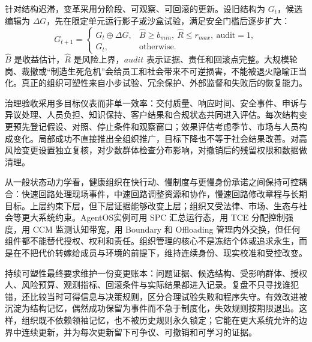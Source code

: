 针对结构迟滞，变革采用分阶段、可观察、可回滚的更新。设旧结构为 $G_t$，候选编辑为 $\Delta G$，先在限定单元运行影子或沙盒试验，满足安全门槛后逐步扩大：
\begin{equation}
 G_{t+1}=\begin{cases}G_t\oplus\Delta G,& \widehat B\geq b_{min},\ \widehat R\leq r_{max},\ \text{audit}=1,\\G_t,&\text{otherwise}.\end{cases}
\end{equation}
$\widehat B$ 是收益估计，$\widehat R$ 是风险上界，$audit$ 表示证据、责任和回滚点完整。大规模轮岗、裁撤或“制造生死危机”会给员工和社会带来不可逆损害，不能被退火隐喻正当化。真正的组织可塑性来自小步试验、冗余保护、外部监督和失败后的恢复能力。

治理验收采用多目标仪表而非单一效率：交付质量、响应时间、安全事件、申诉与异议处理、人员负担、知识保持、客户结果和合规状态共同进入评估。每次结构变更预先登记假设、对照、停止条件和观察窗口；效果评估考虑季节、市场与人员构成变化。局部成功不直接推出全组织推广，目标下降也不等于社会结果改善。对高风险变更设置独立复核，对少数群体检查分布影响，对撤销后的残留权限和数据做清理。

从一般状态动力学看，健康组织在快行动、慢制度与更慢身份承诺之间保持可控耦合：快速回路处理现场事件，中速回路调整资源和协作，慢速回路修改章程与长期目标。上层约束下层，但下层证据能够改变上层；组织又受法律、市场、生态与社会等更大系统约束。AgentOS实例可用 SPC 汇总运行态，用 TCE 分配控制强度，用 CCM 监测认知带宽，用 Boundary 和 Offloading 管理内外交换，但任何组件都不能替代授权、权利和责任。组织管理的核心不是冻结个体或追求永生，而是在不把代价转嫁给成员与环境的前提下，维持连续身份、现实校准和受控改变。

持续可塑性最终要求维护一份变更账本：问题证据、候选结构、受影响群体、授权人、风险预算、观测指标、回滚条件与实际结果都进入记录。复盘不只寻找谁犯错，还比较当时可得信息与决策规则，区分合理试验失败和程序失守。有效改进被沉淀为结构记忆，偶然成功保留为事件而不急于制度化，失效规则按期限退出。这样，组织既不依赖领袖记忆，也不被历史规则永久锁定；它能在更大系统允许的边界中连续更新，并为每次更新留下可争议、可撤销和可学习的证据。
